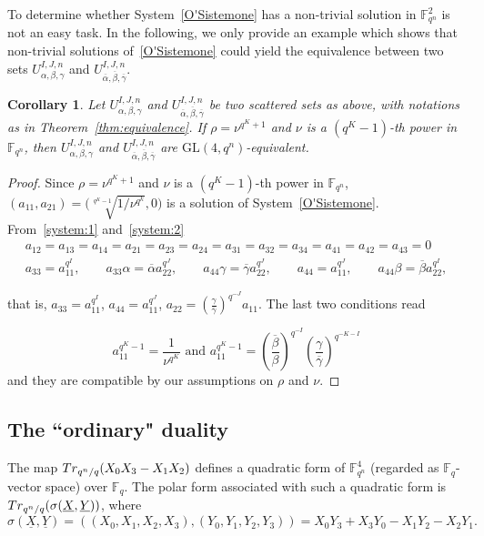 \documentclass[11pt]{article}
\newtheorem{coro}[theo]{Corollary}
\theoremstyle{definition}
\numberwithin{equation}{section}
\begin{document}
To determine whether System~\eqref{O'Sistemone} has a non-trivial solution in $\mathbb{F}_{q^n}^2$ is not an easy task. In the following, we only provide an example which shows that non-trivial solutions of~\eqref{O'Sistemone} could  yield the equivalence between  two sets $U_{\alpha, \beta, \gamma}^{I,J,n}$ and $U_{\overline{\alpha}, \overline{\beta}, \overline{\gamma}}^{I,J,n}$.

\begin{coro}
\label{cor:equivalence:3}
Let $U_{\alpha, \beta, \gamma}^{I,J,n}$ and $U_{\overline{\alpha}, \overline{\beta}, \overline{\gamma}}^{I,J,n}$ be two scattered sets as above, with notations as in Theorem~\ref{thm:equivalence}. 
If $\rho = \nu^{q^K+1}$ and $\nu$ is a $\left(q^K-1\right)$-th power in $\mathbb{F}_{q^n}$, then $U_{\alpha, \beta, \gamma}^{I,J,n}$ and $U_{\overline{\alpha}, \overline{\beta}, \overline{\gamma}}^{I,J,n}$ are $\textrm{GL}(4,q^n)$-equivalent.
\end{coro}

\begin{proof}
Since $\rho = \nu^{q^K+1}$ and $\nu$ is a $\left(q^K-1\right)$-th power in $\mathbb{F}_{q^n}$, $(a_{11},a_{21})=\Big(\sqrt[q^{K}-1]{1/\nu^{q^k}},0\Big)$ is a solution of  System~\eqref{O'Sistemone}. 
From~\eqref{system:1} and~\eqref{system:2} 
\begin{eqnarray*}a_{12}=a_{13}=a_{14}=a_{21}=a_{23}=a_{24}=a_{31} = a_{32} = a_{34} = a_{41}=a_{42}=a_{43}=0\\
        a_{33} = a_{11}^{q^I}, \qquad 
        a_{33}\alpha = \overline{\alpha}a_{22}^{q^J}, \qquad 
             a_{44}\gamma = \overline{\gamma}a_{22}^{q^J}, \qquad 
        a_{44} = a_{11}^{q^J}, \qquad 
        a_{44}\beta = \overline{\beta}a_{22}^{q^I},
\end{eqnarray*}

that is, $a_{33} = a_{11}^{q^I}$, $a_{44} = a_{11}^{q^J}$, $a_{22}=\left(\frac{\gamma}{\overline{\gamma}}\right)^{q^{-J}}a_{11}$. The last two conditions read 

$$a_{11}^{q^K-1}=\frac{1}{\nu^{q^K}} \textrm{ and } a_{11}^{q^K-1}=\left(\frac{\overline{\beta}}{\beta}\right)^{q^{-I}}\left(\frac{\gamma}{\overline{\gamma}}\right)^{q^{-K-I}}$$
and they are compatible by our assumptions on $\rho$ and $\nu$.
\end{proof} 
 
\subsection{The ``ordinary" duality}
The map ${\rm Tr}_{{q^n}/q}(X_0X_3-X_1X_2)$ defines a quadratic form of
${\mathbb F}_{q^n}^4$ (regarded as $\mathbb{F}_q$-vector space) over $\mathbb{F}_q$. The polar form
associated with such a quadratic form is
${\rm Tr}_{{q^n}/q}(\sigma(\underline{X},\underline{Y}))$, where $$\sigma (\underline{X},\underline{Y})=\left((X_0,X_1,X_2,X_3),(Y_0,Y_1,Y_2,Y_3)\right)=X_0Y_3+X_3Y_0-X_1Y_2-X_2Y_1.$$ 
\end{document}
